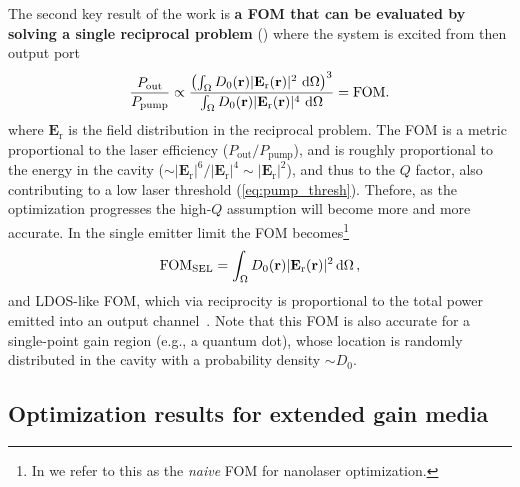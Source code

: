 The second key result of the work is \textbf{a FOM that can be evaluated by solving a single reciprocal problem} () where the system is excited from then output port~\cite{ownpub4}
\begin{equation}\label{eq:eff_nl}
    \frac{P_\text{out}}{P_\text{pump}} \propto \frac{\left( \int_{\Omega} D_0(\mathbf{r})|\mathbf{E}_{\text{r}}(\mathbf{r})|^2 \,  \mathop{}\!\text{d} \Omega \right)^3} {\int_{\Omega} D_0(\mathbf{r}) |\mathbf{E}_{\text{r}}(\mathbf{r})|^4 \,  \mathop{}\!\text{d} \Omega} = \text{FOM}.
\end{equation}
where $\mathbf{E}_{\text{r}}$ is the field distribution in the reciprocal problem. The FOM is a metric proportional to the laser efficiency ($P_\text{out}/P_\text{pump}$), and is roughly proportional 
to the energy in the cavity ($\sim |\mathbf{E}_{\text{r}}|^6 / |\mathbf{E}_{\text{r}}|^4 \sim |\mathbf{E}_{\text{r}}|^2$), and thus to the $Q$ factor, also contributing to a low
laser threshold (\eqref{eq:pump_thresh}). Thefore, as the optimization progresses the high-$Q$ assumption will become more and more accurate. In the single emitter limit the FOM becomes\footnote{In \cite{ownpub4} we refer to this as the \emph{naive} FOM for nanolaser optimization.}
\begin{equation}\label{eq:SEL}
    \text{FOM}_\text{SEL}=\int_{\Omega} D_0(\mathbf{r}) |\mathbf{E}_{\text{r}}(\mathbf{r})|^2 \mathop{}\!\text{d} \Omega\,,
\end{equation}
and LDOS-like FOM, which via reciprocity is proportional to the total power emitted into an output channel~\cite[App.~C]{reci}. Note that this FOM is also accurate for a single-point gain region (e.g., a quantum dot),
whose location is randomly distributed in the cavity with a probability density $\sim D_0$. 

\subsection*{Optimization results for extended gain media}

